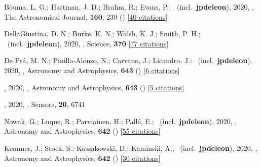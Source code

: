 \item[{\color{numcolor}\scriptsize132}] Bouma, L. G.; Hartman, J. D.; Brahm, R.; Evans, P.; \etal\ (incl.\ \textbf{jpdeleon}), 2020, , The Astronomical Journal, \textbf{160}, 239 () [\href{https://ui.adsabs.harvard.edu/abs/2020AJ....160..239B}{40 citations}]

\item[{\color{numcolor}\scriptsize131}] DellaGiustina, D. N.; Burke, K. N.; Walsh, K. J.; Smith, P. H.; \etal\ (incl.\ \textbf{jpdeleon}), 2020, , Science, \textbf{370} [\href{https://ui.adsabs.harvard.edu/abs/2020Sci...370.3660D}{77 citations}]

\item[{\color{numcolor}\scriptsize130}] De Pr{\'a}, M. N.; Pinilla-Alonso, N.; Carvano, J.; Licandro, J.; \etal\ (incl.\ \textbf{jpdeleon}), 2020, , Astronomy and Astrophysics, \textbf{643} () [\href{https://ui.adsabs.harvard.edu/abs/2020A&A...643A.102D}{6 citations}]

\item[{\color{numcolor}\scriptsize129}] , 2020, , Astronomy and Astrophysics, \textbf{643} () [\href{https://ui.adsabs.harvard.edu/abs/2020A&A...643A.107M}{5 citations}]

\item[{\color{numcolor}\scriptsize128}] , 2020, , Sensors, \textbf{20}, 6741

\item[{\color{numcolor}\scriptsize127}] Nowak, G.; Luque, R.; Parviainen, H.; Pall{\'e}, E.; \etal\ (incl.\ \textbf{jpdeleon}), 2020, , Astronomy and Astrophysics, \textbf{642} () [\href{https://ui.adsabs.harvard.edu/abs/2020A&A...642A.173N}{55 citations}]

\item[{\color{numcolor}\scriptsize126}] Kemmer, J.; Stock, S.; Kossakowski, D.; Kaminski, A.; \etal\ (incl.\ \textbf{jpdeleon}), 2020, , Astronomy and Astrophysics, \textbf{642} () [\href{https://ui.adsabs.harvard.edu/abs/2020A&A...642A.236K}{30 citations}]


